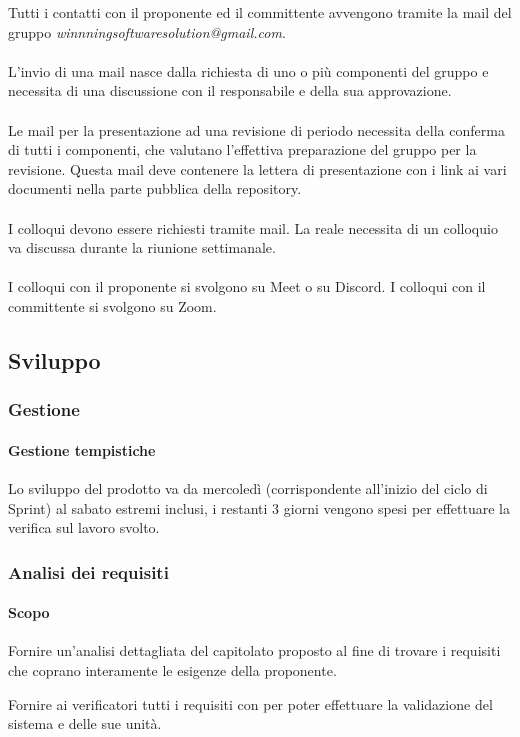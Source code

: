 \documentclass[a4paper, 12pt]{article}
\begin{document}
Tutti i contatti con il proponente ed il committente avvengono tramite la mail del gruppo \textit{winnningsoftwaresolution@gmail.com}.\\\\
L'invio di una mail nasce dalla richiesta di uno o più componenti del gruppo e necessita di una discussione con il responsabile e della sua approvazione.\\\\
Le mail per la presentazione ad una revisione di periodo necessita della conferma di tutti i componenti, che valutano l'effettiva preparazione del gruppo per la revisione. Questa mail deve contenere la lettera di presentazione con i link ai vari documenti nella parte pubblica della repository.\\\\
I colloqui devono essere richiesti tramite mail. La reale necessita di un colloquio va discussa durante la riunione settimanale.\\\\
I colloqui con il proponente si svolgono su Meet o su Discord. I colloqui con il committente si svolgono su Zoom.
\subsection{Sviluppo}\label{processi-primari-sviluppo}
\subsubsection{Gestione}
\paragraph{Gestione tempistiche}
Lo sviluppo del prodotto va da mercoledì (corrispondente all'inizio del ciclo di Sprint) al sabato estremi inclusi, i restanti 3 giorni vengono spesi per effettuare la verifica sul lavoro svolto. 
\subsubsection{Analisi dei requisiti}
\paragraph{Scopo}
Fornire un'analisi dettagliata del capitolato proposto al fine di trovare i requisiti che coprano interamente le esigenze della proponente.

Fornire ai verificatori tutti i requisiti con per poter effettuare la validazione del sistema e delle sue unità.
\end{document}
